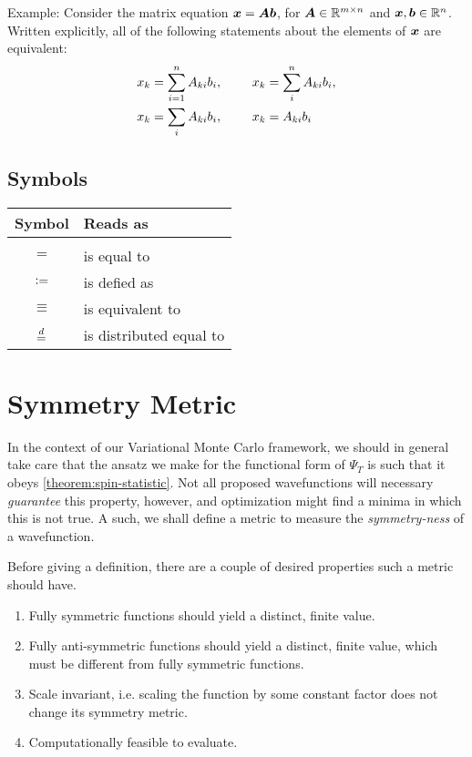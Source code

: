 \documentclass[Thesis.tex]{subfiles}
\begin{document}
Example: Consider the matrix equation $\bm{x} = \bm{A}\bm{b}$, for
$\bm{A}\in\mathbb{R}^{m\times n}$ and $\bm{x}, \bm{b} \in \mathbb{R}^n$. Written
explicitly, all of the following statements about the elements of $\bm{x}$ are equivalent:
\begin{align}
  \begin{split}
  x_k &= \sum_{i=1}^n A_{ki}b_i,\qq{ } x_k = \sum_{i}^n A_{ki}b_i,\\
  x_k &= \sum_{i} A_{ki}b_i,\qq{ } x_k = A_{ki}b_i
  \end{split}
\end{align}
\subsection{Symbols}
\begin{center}
\begin{tabular}{cl}
  Symbol & Reads as\\
  \hline\\
  $=$ & is equal to\\
  $\vcentcolon=$ & is defied as\\
  $\equiv$ & is equivalent to\\
  $\overset{d}{=}$ & is distributed equal to
\end{tabular}
\end{center}

\section{Symmetry Metric}

In the context of our Variational Monte Carlo framework, we should in general
take care that the ansatz we make for the functional form of $\Psi_T$ is such
that it obeys \autoref{theorem:spin-statistic}. Not all proposed wavefunctions
will necessary \emph{guarantee} this property, however, and optimization might
find a minima in which this is not true. A such, we shall define a metric to
measure the \emph{symmetry-ness} of a wavefunction.

Before giving a definition, there are a couple of desired properties such a
metric should have.

\begin{enumerate}
    \item Fully symmetric functions should yield a distinct, finite value.
    \item Fully anti-symmetric functions should yield a distinct, finite value,
        which must be different from fully symmetric functions.
    \item Scale invariant, i.e. scaling the function by
        some constant factor does not change its symmetry metric.
    \item Computationally feasible to evaluate.
\end{enumerate}
\end{document}
